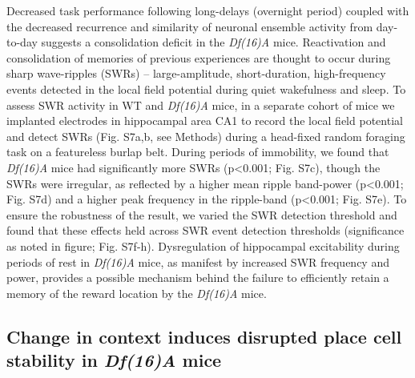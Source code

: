 Decreased task performance following long-delays (overnight period) coupled with the decreased recurrence and similarity of neuronal ensemble activity from day-to-day suggests a consolidation deficit in the \emph{Df(16)A\super{+/-}} mice. Reactivation and consolidation of memories of previous experiences are thought to occur during sharp wave-ripples (SWRs) – large-amplitude, short-duration, high-frequency events detected in the local field potential \citep{Buzsaki2015}\citep{Diba2007}\citep{Dupret2010a}\citep{Foster2006}\citep{Jadhav2012}\citep{Kudrimoti1999}\citep{Wilson1994} during quiet wakefulness and sleep. To assess SWR activity in WT and \emph{Df(16)A\super{+/-}} mice, in a separate cohort of mice we implanted electrodes in hippocampal area CA1 to record the local field potential and detect SWRs (Fig. S7a,b, see Methods) during a head-fixed random foraging task on a featureless burlap belt. During periods of immobility, we found that \emph{Df(16)A\super{+/-}} mice had significantly more SWRs (p<0.001; Fig. S7c),  though the SWRs were irregular, as reflected by a higher mean ripple band-power (p<0.001; Fig. S7d) and a higher peak frequency in the ripple-band (p<0.001; Fig. S7e). To ensure the robustness of the result, we varied the SWR detection threshold and found that these effects held across SWR event detection thresholds (significance as noted in figure; Fig. S7f-h). Dysregulation of hippocampal excitability during periods of rest in \emph{Df(16)A\super{+/-}} mice, as manifest by increased SWR frequency and power, provides a possible mechanism behind the failure to efficiently retain a memory of the reward location by the \emph{Df(16)A\super{+/-}} mice.

\subsection{Change in context induces disrupted place cell stability in \emph{Df(16)A\super{+/-}} mice}

